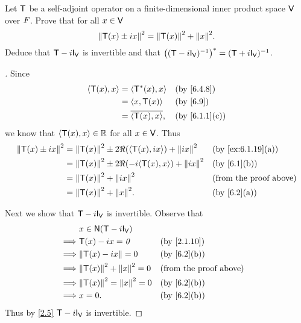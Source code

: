 \begin{ex}\label{ex:6.4.10}
  Let \(\mathsf{T}\) be a self-adjoint operator on a finite-dimensional inner product space \(\mathsf{V}\) over \(\mathit{F}\).
  Prove that for all \(x \in \mathsf{V}\)
  \[
    \norm{\T(x) \pm ix}^2 = \norm{\T(x)}^2 + \norm{x}^2.
  \]
  Deduce that \(\T - i \IT[\V]\) is invertible and that \(\pa{(\T - i \IT[\V])^{-1}}^* = (\T + i \IT[\V])^{-1}\).
\end{ex}

\begin{proof}[]
  Since
  \begin{align*}
    \inn{\T(x), x} & = \inn{\T^*(x), x}       &  & \text{(by \cref{6.4.8})}    \\
                   & = \inn{x, \T(x)}         &  & \text{(by \cref{6.9})}      \\
                   & = \conj{\inn{\T(x), x}}, &  & \text{(by \cref{6.1.1}(c))}
  \end{align*}
  we know that \(\left\langle\mathsf{T}(x), x\right\rangle \in \mathbb{R}\) for all \(x \in \mathsf{V}\).
  Thus
  \begin{align*}
    \norm{\T(x) \pm ix}^2 & = \norm{\T(x)}^2 \pm 2 \Re(\inn{\T(x), ix}) + \norm{ix}^2   &  & \text{(by \cref{ex:6.1.19}(a))} \\
                          & = \norm{\T(x)}^2 \pm 2 \Re(-i \inn{\T(x), x}) + \norm{ix}^2 &  & \text{(by \cref{6.1}(b))}       \\
                          & = \norm{\T(x)}^2 + \norm{ix}^2                              &  & \text{(from the proof above)}   \\
                          & = \norm{\T(x)}^2 + \norm{x}^2.                              &  & \text{(by \cref{6.2}(a))}
  \end{align*}

  Next we show that \(\T - i \IT[\V]\) is invertible.
  Observe that
  \begin{align*}
             & x \in \ns{\T - i \IT[\V]}                                          \\
    \implies & \T(x) - ix = \zv                &  & \text{(by \cref{2.1.10})}     \\
    \implies & \norm{\T(x) - ix} = 0           &  & \text{(by \cref{6.2}(b))}     \\
    \implies & \norm{\T(x)}^2 + \norm{x}^2 = 0 &  & \text{(from the proof above)} \\
    \implies & \norm{\T(x)}^2 = \norm{x}^2 = 0 &  & \text{(by \cref{6.2}(b))}     \\
    \implies & x = 0.                          &  & \text{(by \cref{6.2}(b))}
  \end{align*}
  Thus by \cref{2.5} \(\T - i \IT[\V]\) is invertible.


\end{proof}
